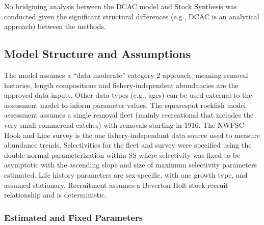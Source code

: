 \documentclass[11pt,
  english,
  a4paper,
]{article}
\begin{document}
\leavevmode\tagmcend\tagstructend


No bridgining analysis between the DCAC model and Stock Synthesis was conducted given the significant structural differences (e.g., DCAC is an analytical approach) between the methods.

\leavevmode\tagmcend\tagstructend\par


\hypertarget{model-structure-and-assumptions}{%
\subsection{Model Structure and Assumptions}\label{model-structure-and-assumptions}}

\leavevmode\tagmcend\tagstructend


The model assumes a ``data-moderate'' category 2 approach, meaning removal histories, length compositions and fishery-independent abundancies are the approved data inputs. Other data types (e.g., ages) can be used external to the assessment model to inform parameter values. The squarespot rockfish model assessment assumes a single removal fleet (mainly recreational that includes the very small commercial catches) with removals starting in 1916. The NWFSC Hook and Line survey is the one fishery-independant data source used to measure abundance trends. Selectivities for the fleet and survey were specified using the double normal parameterization within SS where selectivity was fixed to be asymptotic with the ascending slope and size of maximum selectivity parameters estimated. Life history parameters are sex-specific, with one growth type, and assumed stationary. Recruitment assumes a Beverton-Holt stock-recruit relationship and is deterministic.

\leavevmode\tagmcend\tagstructend\par


\hypertarget{estimated-and-fixed-parameters}{%
\subsubsection{Estimated and Fixed Parameters}\label{estimated-and-fixed-parameters}}
\end{document}
